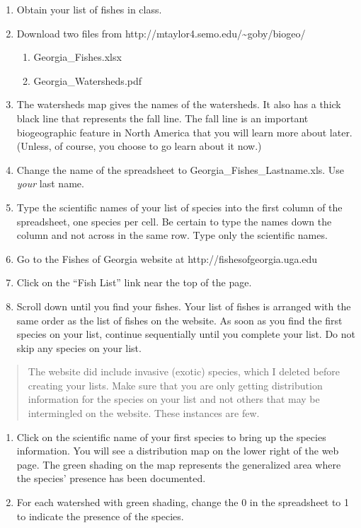 \documentclass[12pt]{exam}
\begin{document}
\begin{enumerate}
\item
  Obtain your list of fishes in class.
\item
  Download two files from
  http://mtaylor4.semo.edu/\textasciitilde{}goby/biogeo/

  \begin{enumerate}
  \def\labelenumii{\arabic{enumii}.}
  \item
    Georgia\_Fishes.xlsx
  \item
    Georgia\_Watersheds.pdf
  \end{enumerate}
\item
  The watersheds map gives the names of the watersheds. It also 
  has a thick black line that represents the fall line. The fall 
  line is an important biogeographic feature in North America 
  that you will learn more about later. (Unless, of course, you 
  choose to go learn about it now.)
\item
  Change the name of the spreadsheet to Georgia\_Fishes\_Lastname.xls.
  Use \emph{your} last name.
\item
  Type the scientific names of your list of species into the first
  column of the spreadsheet, one species per cell. Be certain to 
  type the names down the column and not across in the same row. 
  Type only the scientific names.
\item
  Go to the Fishes of Georgia website at http://fishesofgeorgia.uga.edu
\item
  Click on the ``Fish List'' link near the top of the page.
\item
  Scroll down until you find your fishes. Your list of fishes is
  arranged with the same order as the list of fishes on the 
  website. As soon as you find the first species on your list, 
  continue sequentially until you complete your list. Do not skip 
  any species on your list.
\end{enumerate}

\begin{quote}
The website did include invasive (exotic) species, which I deleted
before creating your lists. Make sure that you are only getting
distribution information for the species on your list and not 
others that may be intermingled on the website. These instances 
are few.
\end{quote}

\begin{enumerate}[resume]
\item
  Click on the scientific name of your first species to bring up 
  the species information. You will see a distribution map on the 
  lower right of the web page. The green shading on the map 
  represents the generalized area where the species' presence has 
  been documented.
\item
  For each watershed with green shading, change the 0 in the 
  spreadsheet to 1 to indicate the presence of the species.
\end{enumerate}
\end{document}

